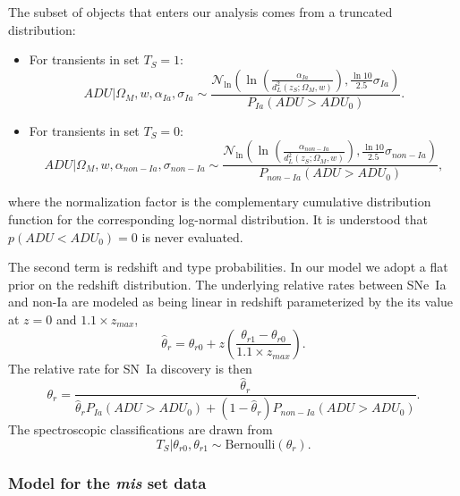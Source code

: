 \documentclass[preprint]{aastex}
\begin{document}
The subset of objects that enters our analysis comes from a truncated distribution:
\begin{itemize}
\item For transients in set $T_S=1$:
\begin{equation}
\mathit{ADU} | \Omega_M, w, \alpha_{Ia},\sigma_{Ia} \sim
\frac{\mathcal{N}_{\ln}\left(\ln{\left(\frac{\alpha_{Ia}}{d_L^2(z_S;\Omega_M, w)}\right)}, \frac{\ln{10}}{2.5}\sigma_{Ia}\right)}{P_{Ia}(\mathit{ADU} > \mathit{ADU}_0)}.
\label{adusnIa:eqn}
\end{equation}
\item For transients in set $T_S=0$:
\begin{equation}
\mathit{ADU} | \Omega_M, w, \alpha_{\mathit{non-Ia}},\sigma_{\mathit{non-Ia}}\sim 
\frac{\mathcal{N}_{\ln}\left(\ln{\left(\frac{\alpha_{\mathit{non-Ia}}}{d_L^2(z_S;\Omega_M, w)}\right)}, \frac{\ln{10}}{2.5}\sigma_{\mathit{non-Ia}}\right)}{P_{non-Ia}(\mathit{ADU} > \mathit{ADU}_0)},
\label{adunonIa:eqn}
\end{equation}
\end{itemize}
where the normalization factor is the complementary cumulative distribution function
for the corresponding log-normal distribution.
It is understood that $p(\mathit{ADU}<\mathit{ADU}_0)=0$ is never evaluated.

The second term is redshift and type probabilities.  In our model we adopt
a flat prior on the redshift distribution.
The underlying relative rates between SNe~Ia and non-Ia are modeled
as being linear in redshift parameterized by the
its value at $z=0$ and $1.1 \times z_{max}$, 
\begin{equation}
\hat{\theta}_{r}=\theta_{r0}+z\left(\frac{\theta_{r1}-\theta_{r0}}{1.1 \times z_{max}}\right).
\end{equation}
The relative rate for SN~Ia discovery is then
\begin{equation}
\theta_{r}=\frac{\hat{\theta}_{r}}{\hat{\theta}_{r}P_{Ia}(\mathit{ADU} > \mathit{ADU}_0) + (1-\hat{\theta}_{r})P_{non-Ia}(\mathit{ADU} > \mathit{ADU}_0)}.
\end{equation}
The spectroscopic classifications are drawn from
\begin{equation}
T_S | \theta_{r0}, \theta_{r1} \sim \text{Bernoulli}(\theta_r).
\end{equation}

\subsubsection{Model for the {\it mis} set data}
\end{document}
